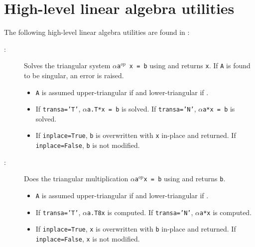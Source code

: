 \documentclass{manual}
\begin{document}
\section{High-level linear algebra utilities}
The following high-level linear algebra utilities are found in :
\begin{description}

    \item[:] Solves the triangular system \texttt{$\alpha$a$^{op}$ x = b} using  and returns \texttt{x}. If \texttt{A} is found to be singular, an error is raised. 
    \begin{itemize}
        \item \texttt{A} is assumed upper-triangular if  and lower-triangular if .
        \item If \texttt{transa='T'}, \texttt{$\alpha$a.T*x = b} is solved. If \texttt{transa='N'}, \texttt{$\alpha$a*x = b} is solved.
        \item If \texttt{inplace=True}, \texttt{b} is overwritten with \texttt{x} in-place and returned. If \texttt{inplace=False}, \texttt{b} is not modified.
    \end{itemize}

    \item[:] Does the triangular multiplication \texttt{$\alpha$a$^{op}$x = b} using  and returns \texttt{b}.
    \begin{itemize}
        \item \texttt{A} is assumed upper-triangular if  and lower-triangular if .
        \item If \texttt{transa='T'}, \texttt{$\alpha$a.T8x} is computed. If \texttt{transa='N'}, \texttt{$\alpha$a*x} is computed.
        \item If \texttt{inplace=True}, \texttt{x} is overwritten with \texttt{b} in-place and returned. If \texttt{inplace=False}, \texttt{x} is not modified.
    \end{itemize}    
\end{description}
        
    
\end{document}
